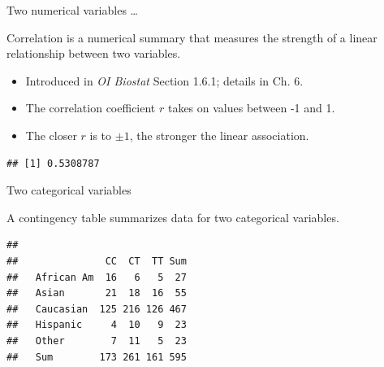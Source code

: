 \documentclass[
  ignorenonframetext,
]{beamer}
\newenvironment{Shaded}{\begin{snugshade}}{\end{snugshade}}
\newcommand{\KeywordTok}[1]{\textcolor[rgb]{0.13,0.29,0.53}{\textbf{#1}}}
\newcommand{\NormalTok}[1]{#1}
\newcommand{\OperatorTok}[1]{\textcolor[rgb]{0.81,0.36,0.00}{\textbf{#1}}}
\begin{document}
\begin{frame}[fragile]{Two numerical variables \dots}
\protect\hypertarget{two-numerical-variables-2}{}

Correlation is a numerical summary that measures the strength of a
linear relationship between two variables.

\begin{itemize}
\item
  Introduced in \emph{OI Biostat} Section 1.6.1; details in Ch. 6.
\item
  The correlation coefficient \(r\) takes on values between -1 and 1.
\item
  The closer \(r\) is to \(\pm 1\), the stronger the linear association.
\end{itemize}

\scriptsize

\begin{Shaded}
\end{Shaded}

\begin{verbatim}
## [1] 0.5308787
\end{verbatim}

\normalsize

\end{frame}

\begin{frame}[fragile]{Two categorical variables}
\protect\hypertarget{two-categorical-variables}{}

A contingency table summarizes data for two categorical variables.

\scriptsize

\begin{Shaded}
\end{Shaded}

\begin{verbatim}
##             
##               CC  CT  TT Sum
##   African Am  16   6   5  27
##   Asian       21  18  16  55
##   Caucasian  125 216 126 467
##   Hispanic     4  10   9  23
##   Other        7  11   5  23
##   Sum        173 261 161 595
\end{verbatim}

\normalsize

\end{frame}
\end{document}
